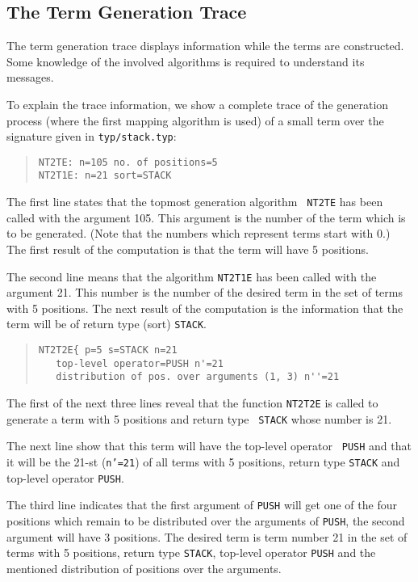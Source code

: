 \subsection{The Term Generation Trace}
\label{TermGenerationTrace}
The term generation trace displays information while the terms are
constructed.
Some knowledge of the involved algorithms is required to
understand its messages.

To explain the trace information, we show a complete trace of the
generation process (where the first mapping algorithm is used) of a
small term over the signature given in {\tt typ/stack.typ}:

\begin{quote}
\begin{verbatim}
NT2TE: n=105 no. of positions=5
NT2T1E: n=21 sort=STACK
\end{verbatim}
\end{quote}
The first line states that the topmost generation algorithm {\tt
NT2TE} has been called with the argument 105. This argument is the
number of the term which is to be generated. (Note that the numbers
which represent terms start with 0.) The first result of the computation
is that the term will have 5 positions.

The second line means that the algorithm {\tt NT2T1E} has been called
with the argument 21. This number is the number of the desired term in
the set of terms with 5 positions. The next result of  the computation
is  the information that the term will be of return type (sort)
{\tt STACK}.

\begin{quote}
\begin{verbatim}
NT2T2E{ p=5 s=STACK n=21
   top-level operator=PUSH n'=21
   distribution of pos. over arguments (1, 3) n''=21
\end{verbatim}
\end{quote}
The first of the next three lines reveal that the function {\tt NT2T2E}
is called to generate a term with 5 positions and return type {\tt
STACK} whose number is 21.

The next line show that this term will have the top-level operator {\tt
PUSH} and that it will be the 21-st ({\tt n'=21}) of all terms with 5
positions, return type {\tt STACK} and top-level operator {\tt PUSH}.

The third line indicates that the first argument of {\tt PUSH} will get
one of the four positions which remain to be
distributed over the arguments of {\tt PUSH}, the second argument will
have 3 positions. The desired term is term number 21 in the set of terms
with 5 positions, return type {\tt STACK}, top-level operator {\tt PUSH}
and the mentioned distribution of positions over the arguments.

